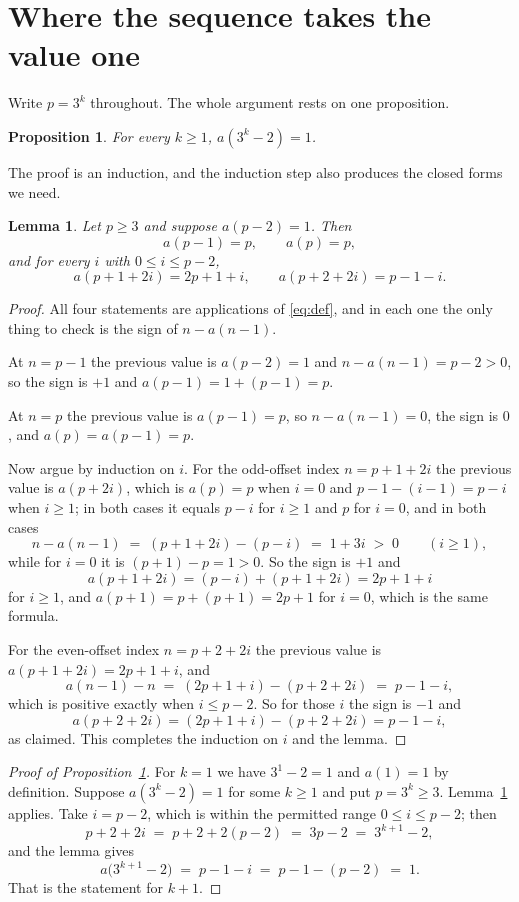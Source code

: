 \documentclass[11pt,a4paper]{article}
\theoremstyle{plain}
\newtheorem{lemma}[theorem]{Lemma}
\newtheorem{proposition}[theorem]{Proposition}
\theoremstyle{definition}
\begin{document}
\section{Where the sequence takes the value one}

Write $p=3^{k}$ throughout. The whole argument rests on one proposition.

\begin{proposition}\label{prop:ones}
For every $k\ge1$, $a(3^{k}-2)=1$.
\end{proposition}

The proof is an induction, and the induction step also produces the closed forms we need.

\begin{lemma}\label{lem:block}
Let $p\ge3$ and suppose $a(p-2)=1$. Then
\[
a(p-1)=p,\qquad a(p)=p,
\]
and for every $i$ with $0\le i\le p-2$,
\[
a(p+1+2i)=2p+1+i,\qquad a(p+2+2i)=p-1-i .
\]
\end{lemma}

\begin{proof}
All four statements are applications of \eqref{eq:def}, and in each one the only thing to
check is the sign of $n-a(n-1)$.

At $n=p-1$ the previous value is $a(p-2)=1$ and $n-a(n-1)=p-2>0$, so the sign is $+1$ and
$a(p-1)=1+(p-1)=p$.

At $n=p$ the previous value is $a(p-1)=p$, so $n-a(n-1)=0$, the sign is $0$, and
$a(p)=a(p-1)=p$.

Now argue by induction on $i$. For the odd-offset index $n=p+1+2i$ the previous value is
$a(p+2i)$, which is $a(p)=p$ when $i=0$ and $p-1-(i-1)=p-i$ when $i\ge1$; in both cases it
equals $p-i$ for $i\ge 1$ and $p$ for $i=0$, and in both cases
\[
n-a(n-1)\;=\;(p+1+2i)-(p-i)\;=\;1+3i\;>\;0 \qquad(i\ge1),
\]
while for $i=0$ it is $(p+1)-p=1>0$. So the sign is $+1$ and
\[
a(p+1+2i)=(p-i)+(p+1+2i)=2p+1+i
\]
for $i\ge1$, and $a(p+1)=p+(p+1)=2p+1$ for $i=0$, which is the same formula.

For the even-offset index $n=p+2+2i$ the previous value is $a(p+1+2i)=2p+1+i$, and
\[
a(n-1)-n\;=\;(2p+1+i)-(p+2+2i)\;=\;p-1-i,
\]
which is positive exactly when $i\le p-2$. So for those $i$ the sign is $-1$ and
\[
a(p+2+2i)=(2p+1+i)-(p+2+2i)=p-1-i,
\]
as claimed. This completes the induction on $i$ and the lemma.
\end{proof}

\begin{proof}[Proof of Proposition~\ref{prop:ones}]
For $k=1$ we have $3^{1}-2=1$ and $a(1)=1$ by definition. Suppose $a(3^{k}-2)=1$ for some
$k\ge1$ and put $p=3^{k}\ge3$. Lemma~\ref{lem:block} applies. Take $i=p-2$, which is within
the permitted range $0\le i\le p-2$; then
\[
p+2+2i\;=\;p+2+2(p-2)\;=\;3p-2\;=\;3^{k+1}-2,
\]
and the lemma gives
\[
a\bigl(3^{k+1}-2\bigr)\;=\;p-1-i\;=\;p-1-(p-2)\;=\;1 .
\]
That is the statement for $k+1$.
\end{proof}
\end{document}
